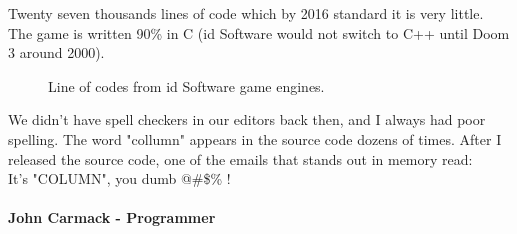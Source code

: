 \documentclass[book.tex]{subfiles}
\begin{document}
\par
Twenty seven thousands lines of code which by 2016 standard it is very little. The game is written 90\% in C (id Software would not switch to C++ until Doom 3 around 2000).\\
\par
\begin{figure}[H]
\centering
   \caption{Line of codes from id Software game engines.}
 \end{figure}
 
\par

 \begin{fancyquotes}
   We didn't have spell checkers in our editors back then, and I always had poor spelling.  The word "collumn" appears in the source code dozens of times.  After I released the source code, one of the emails that stands out in memory read:
 \bigskip \\
It's "COLUMN", you dumb @\#\$\% !\\
 \bigskip \\
\textbf{John Carmack - Programmer}
 \end{fancyquotes}
 
\end{document}

